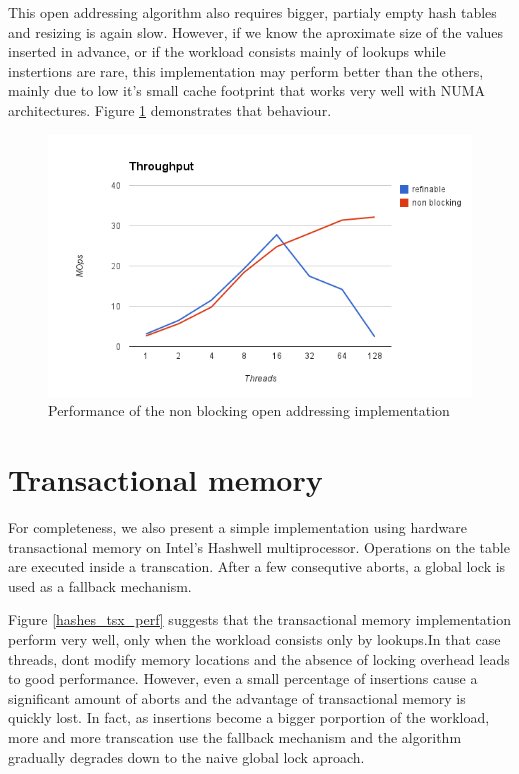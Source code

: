This open addressing algorithm also requires bigger, partialy empty hash tables and resizing is again slow. However, if we know the aproximate size of the values inserted in advance, or if the workload consists mainly of lookups while instertions are rare, this implementation may perform better than the others,  mainly due to low it's small cache footprint that works very well with NUMA architectures. Figure \ref{hashes_non_blocking_perf} demonstrates that behaviour.

\begin{figure}
 \centering
  \includegraphics[scale=0.5]{hashes_non_blocking_perf.png}
\caption{Performance of the non blocking open addressing implementation}
\label{hashes_non_blocking_perf}
\end{figure}

\section{Transactional memory}

For completeness, we also present a simple implementation using hardware transactional memory on Intel's Hashwell multiprocessor. Operations on the table are executed inside a transcation. After a few consequtive aborts, a global lock is used as a fallback mechanism.

Figure \ref{hashes_tsx_perf} suggests that the transactional memory implementation perform very well, only when the workload consists only by lookups.In that case threads, dont modify memory locations and the absence of locking overhead leads to good performance. However, even a small percentage of insertions cause a significant amount of aborts and the advantage of transactional memory is quickly lost. In fact, as insertions become a bigger porportion of the workload, more and more transcation use the fallback mechanism and the algorithm gradually degrades down to the naive global lock aproach.

